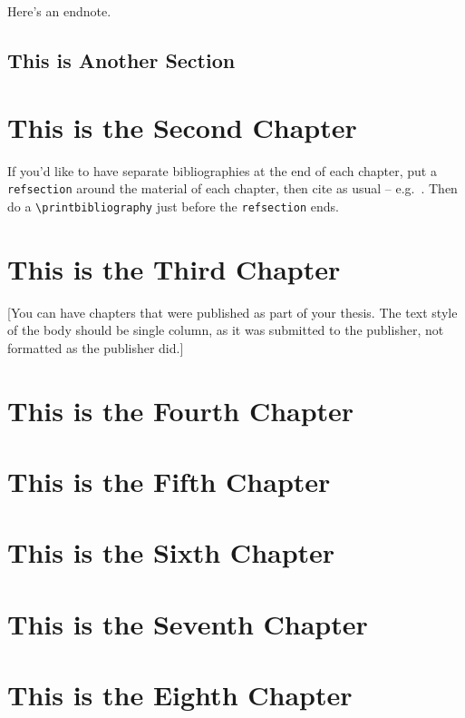 Here's an endnote.

\section{This is Another Section}
\lipsum[6-7]

\chapter{This is the Second Chapter}
\begin{refsection}
    If you'd like to have separate bibliographies at the end of each chapter, put a \verb|refsection| around the material of each chapter, then cite as usual -- e.g.~\citep{GMP81,Ful83}. Then do a \verb|\printbibliography| just before the \verb|refsection| ends. 

    \printbibliography[heading=subbibliography]
\end{refsection}


\chapter{This is the Third Chapter}


[You can have chapters that were published as part of your thesis. The text style of the body should be single column, as it was submitted to the publisher, not formatted as the publisher did.]

\chapter{This is the Fourth Chapter}
\chapter{This is the Fifth Chapter}
\chapter{This is the Sixth Chapter}
\chapter{This is the Seventh Chapter}
\chapter{This is the Eighth Chapter}
